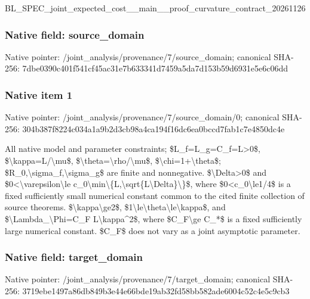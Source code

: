 \documentclass[10pt,a4paper]{article}
\begin{document}
BL\_SPEC\_joint\_expected\_c\allowbreak{}ost\_\_main\_\_proof\_curvatu\allowbreak{}re\_contract\_20261126


\subsubsection{Native field: source\_domain}


Native pointer: /joint\_analysis/provenan\allowbreak{}ce/7/source\_domain; canonical SHA-256: 7dbe0390c401f541cf45ac31\allowbreak{}e7b633341d7459a5da7d153b\allowbreak{}59d6931e5e6c06dd



\subsubsection{Native item 1}


Native pointer: /joint\_analysis/provenan\allowbreak{}ce/7/source\_domain/0; canonical SHA-256: 304b387f8224c034a1a9b2d3\allowbreak{}cb98a4ca194f16dc6ea0bccd\allowbreak{}7fab1c7e4850dc4e


All native model and parameter constraints; \$L\_f=L\_g=C\_f=L>0\$, \$\textbackslash{}kappa=L/\textbackslash{}mu\$, \$\textbackslash{}theta=\textbackslash{}rho/\textbackslash{}mu\$, \$\textbackslash{}chi=1+\textbackslash{}theta\$; \$R\_0,\textbackslash{}sigma\_f,\textbackslash{}sigma\_g\$ are finite and nonnegative. \$\textbackslash{}Delta>0\$ and \$0<\textbackslash{}varepsilon\textbackslash{}le c\_0\textbackslash{}min\textbackslash{}\{L,\textbackslash{}sqrt\{L\textbackslash{}Delta\}\textbackslash{}\}\$, where \$0<c\_0\textbackslash{}le1/4\$ is a fixed sufficiently small numerical constant common to the cited finite collection of source theorems. \$\textbackslash{}kappa\textbackslash{}ge2\$, \$1\textbackslash{}le\textbackslash{}theta\textbackslash{}le\textbackslash{}kappa\$, and \$\textbackslash{}Lambda\_\textbackslash{}Phi=C\_F L\textbackslash{}kappa\textasciicircum{}2\$, where \$C\_F\textbackslash{}ge C\_*\$ is a fixed sufficiently large numerical constant. \$C\_F\$ does not vary as a joint asymptotic parameter.


\subsubsection{Native field: target\_domain}


Native pointer: /joint\_analysis/provenan\allowbreak{}ce/7/target\_domain; canonical SHA-256: 3719ebe1497a86db849b3e44\allowbreak{}e66bde19ab32fd58bb582ade\allowbreak{}6004c52c4e5c9cb3
\end{document}
